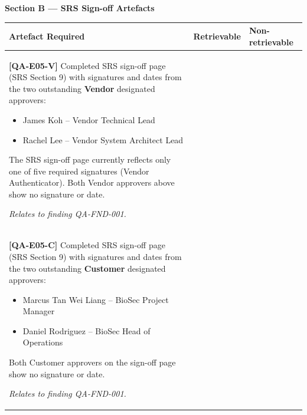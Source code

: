 \documentclass[11pt,a4paper]{article}
\newcommand{\checkbox}{\makebox[1em]{\Square}}
\begin{document}
\vspace{0.4cm}

\noindent\colorbox{sectionbg}{\begin{minipage}{\dimexpr\textwidth-2\fboxsep\relax}
\textbf{Section B --- SRS Sign-off Artefacts}
\end{minipage}}

\vspace{0.3cm}

\renewcommand{\arraystretch}{2.0}
\begin{longtable}{|p{}|p{}|p{}|}
\hline
\rowcolor{tableheader}
\textbf{Artefact Required} & \textbf{Retrievable} & \textbf{Non-retrievable} \\
\hline
\endhead

\rowcolor{highsev}
\small
\textbf{[QA-E05-V]} Completed SRS sign-off page (SRS Section 9) with signatures and dates from the two outstanding \textbf{Vendor} designated approvers:
\begin{itemize}[leftmargin=*,nosep,topsep=2pt,itemsep=1pt]
\item James Koh -- Vendor Technical Lead
\item Rachel Lee -- Vendor System Architect Lead
\end{itemize}
The SRS sign-off page currently reflects only one of five required signatures (Vendor Authenticator). Both Vendor approvers above show no signature or date.

\textit{Relates to finding QA-FND-001.} &
\centering\checkbox &
\centering\checkbox \tabularnewline
\hline

\rowcolor{highsev}
\small
\textbf{[QA-E05-C]} Completed SRS sign-off page (SRS Section 9) with signatures and dates from the two outstanding \textbf{Customer} designated approvers:
\begin{itemize}[leftmargin=*,nosep,topsep=2pt,itemsep=1pt]
\item Marcus Tan Wei Liang -- BioSec Project Manager
\item Daniel Rodriguez -- BioSec Head of Operations
\end{itemize}
Both Customer approvers on the sign-off page show no signature or date.

\textit{Relates to finding QA-FND-001.} &
\centering\checkbox &
\centering\checkbox \tabularnewline
\hline

\end{longtable}
\end{document}
